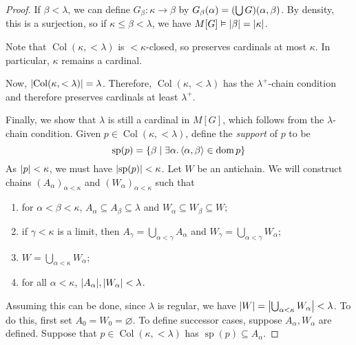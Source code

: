 \begin{proof}
    If \( \beta < \lambda \), we can define \( G_\beta : \kappa \to \beta \) by \( G_\beta(\alpha) = \qty(\bigcup G)(\alpha, \beta) \).
    By density, this is a surjection, so if \( \kappa \leq \beta < \lambda \), we have \( M[G] \vDash \abs{\beta} = \abs{\kappa} \).

    Note that \( \operatorname{Col}(\kappa, <\lambda) \) is \( <\kappa \)-closed, so preserves cardinals at most \( \kappa \).
    In particular, \( \kappa \) remains a cardinal.

    Now, \( \abs{\operatorname{Col}(\kappa, <\lambda)} = \lambda \).
    Therefore, \( \operatorname{Col}(\kappa, <\lambda) \) has the \( \lambda^+ \)-chain condition and therefore preserves cardinals at least \( \lambda^+ \).

    Finally, we show that \( \lambda \) is still a cardinal in \( M[G] \), which follows from the \( \lambda \)-chain condition.
    Given \( p \in \operatorname{Col}(\kappa, <\lambda) \), define the \emph{support} of \( p \) to be
    \[ \operatorname{sp}(p) = \qty{\beta \mid \exists\alpha.\, \langle \alpha, \beta \rangle \in \operatorname{dom}p} \]
    As \( \abs{p} < \kappa \), we must have \( \abs{\operatorname{sp}(p)} < \kappa \).
    Let \( W \) be an antichain.
    We will construct chains \( (A_\alpha)_{\alpha < \kappa} \) and \( (W_\alpha)_{\alpha < \kappa} \) such that
    \begin{enumerate}
        \item for \( \alpha < \beta < \kappa \), \( A_\alpha \subseteq A_\beta \subseteq \lambda \) and \( W_\alpha \subseteq W_\beta \subseteq W \);
        \item if \( \gamma < \kappa \) is a limit, then \( A_\gamma = \bigcup_{\alpha < \gamma} A_\alpha \) and \( W_\gamma = \bigcup_{\alpha < \gamma} W_\alpha \);
        \item \( W = \bigcup_{\alpha < \kappa} W_\alpha \);
        \item for all \( \alpha < \kappa \), \( \abs{A_\alpha}, \abs{W_\alpha} < \lambda \).
    \end{enumerate}
    Assuming this can be done, since \( \lambda \) is regular, we have \( \abs{W} = \abs{\bigcup_{\alpha < \kappa} W_\alpha} < \lambda \).
    To do this, first set \( A_0 = W_0 = \varnothing \).
    To define successor cases, suppose \( A_\alpha, W_\alpha \) are defined.
    Suppose that \( p \in \operatorname{Col}(\kappa, <\lambda) \) has \( \operatorname{sp}(p) \subseteq A_\alpha \).

\end{proof}
